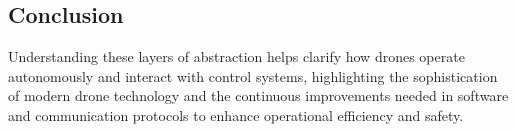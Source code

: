 \subsection{Conclusion}
Understanding these layers of abstraction helps clarify how drones operate autonomously and interact with control systems, highlighting the sophistication of modern drone technology and the continuous improvements needed in software and communication protocols to enhance operational efficiency and safety.

